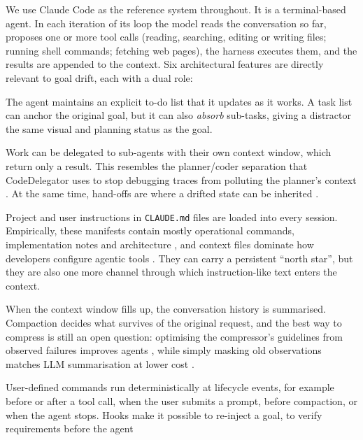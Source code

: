 We use Claude Code \citep{anthropic2026claudecode} as the reference system throughout. It is a
terminal-based agent. In each iteration of its loop the model reads the conversation so far,
proposes one or more tool calls (reading, searching, editing or writing files; running shell
commands; fetching web pages), the harness executes them, and the results are appended to the
context. Six architectural features are directly relevant to goal drift, each with a dual role:
\begin{description}[leftmargin=0pt]
  \item[Task lists.] The agent maintains an explicit to-do list that it updates as it works. A task list
        can anchor the original goal, but it can also \emph{absorb} sub-tasks, giving a distractor the
        same visual and planning status as the goal.
  \item[Sub-agents.] Work can be delegated to sub-agents with their own context window, which
        return only a result. This resembles the planner/coder separation that CodeDelegator uses to
        stop debugging traces from polluting the planner's context \citep{fei2026codedelegator}. At the
        same time, hand-offs are where a drifted state can be inherited \citep{menon2026inherited}.
  \item[Memory files.] Project and user instructions in \texttt{CLAUDE.md} files are loaded into
        every session. Empirically, these manifests contain mostly operational commands,
        implementation notes and architecture \citep{chatlatanagulchai2025manifests}, and context files
        dominate how developers configure agentic tools \citep{galster2026harness}. They can carry a
        persistent ``north star'', but they are also one more channel through which instruction-like
        text enters the context.
  \item[Compaction.] When the context window fills up, the conversation history is summarised.
        Compaction decides what survives of the original request, and the best way to compress is
        still an open question: optimising the compressor's guidelines from observed failures
        improves agents \citep{kang2025acon}, while simply masking old observations matches LLM
        summarisation at lower cost \citep{lindenbauer2025complexity}.
  \item[Hooks.] User-defined commands run deterministically at lifecycle events, for example before
        or after a tool call, when the user submits a prompt, before compaction, or when the agent
        stops. Hooks make it possible to re-inject a goal, to verify requirements before the agent

\end{description}
